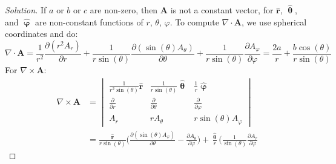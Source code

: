             \begin{proof}[Solution]
                If $a$ or $b$ or $c$ are non-zero,
                then $\mathbf{A}$ is not a constant
                vector, for $\hat{\mathbf{r}}$,
                $\hat{\boldsymbol{\uptheta}}$, and
                $\hat{\boldsymbol{\upvarphi}}$ are
                non-constant functions of
                $r$, $\theta$, $\varphi$.
                To compute $\nabla\cdot\mathbf{A}$,
                we use spherical coordinates and do:
                \begin{equation*}
                    \nabla\cdot\mathbf{A}
                    =\frac{1}{r^{2}}
                    \frac{\partial(r^{2}A_{r})}{\partial{r}}
                    +\frac{1}{r\sin(\theta)}
                    \frac{\partial(\sin(\theta)A_{\theta})}
                         {\partial\theta}
                    +\frac{1}{r\sin(\theta)}
                    \frac{\partial A_{\varphi}}{\partial\varphi}
                    =\frac{2a}{r}
                    +\frac{b\cos(\theta)}{r\sin(\theta)}
                \end{equation*}
                For $\nabla\times\mathbf{A}$:
                \begin{align*}
                    \nabla\times\mathbf{A}
                    &=
                    \begin{vmatrix}
                        \frac{1}{r^{2}\sin(\theta)}\hat{\mathbf{r}}
                        &\frac{1}{r\sin(\theta)}\hat{\boldsymbol{\uptheta}}
                        &\frac{1}{r}\hat{\boldsymbol{\upvarphi}}\\
                        \frac{\partial}{\partial{r}}
                        &\frac{\partial}{\partial\theta}
                        &\frac{\partial}{\partial\varphi}\\
                        A_{r}
                        &rA_{\theta}
                        &r\sin(\theta)A_{\varphi}
                    \end{vmatrix}\\
                    &=\frac{\hat{\mathbf{r}}}{r\sin(\theta)}
                    \bigg(
                        \frac{\partial(\sin(\theta)A_{\varphi})}
                             {\partial\theta}
                        -\frac{\partial{A_{\theta}}}
                              {\partial \varphi}
                    \bigg)
                    +\frac{\hat{\boldsymbol{\uptheta}}}{r}
                    \bigg(
                        \frac{1}{\sin(\theta)}
                        \frac{\partial{A_{r}}}{\partial\varphi}

\end{align*}
\end{proof}
